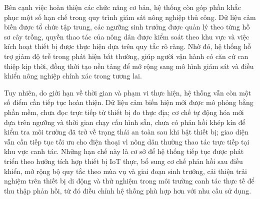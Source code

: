 \documentclass[13pt,a4paper]{extarticle}
\numberwithin{figure}{section}
\numberwithin{table}{section}
\begin{document}
	Bên cạnh việc hoàn thiện các chức năng cơ bản, hệ thống còn góp phần khắc phục một số hạn chế trong quy trình giám sát nông nghiệp thủ công. Dữ liệu cảm biến được tổ chức tập trung, các ngưỡng sinh trưởng được quản lý theo từng hồ sơ cây trồng, quyền thao tác của nông dân được kiểm soát theo khu vực và việc kích hoạt thiết bị được thực hiện dựa trên quy tắc rõ ràng. Nhờ đó, hệ thống hỗ trợ giảm độ trễ trong phát hiện bất thường, giúp người vận hành có căn cứ can thiệp kịp thời, đồng thời tạo nền tảng để mở rộng sang mô hình giám sát và điều khiển nông nghiệp chính xác trong tương lai.
	
	Tuy nhiên, do giới hạn về thời gian và phạm vi thực hiện, hệ thống vẫn còn một số điểm cần tiếp tục hoàn thiện. Dữ liệu cảm biến hiện mới được mô phỏng bằng phần mềm, chưa đọc trực tiếp từ thiết bị đo thực địa; cơ chế tự động hóa mới dựa trên ngưỡng và thời gian chạy cấu hình sẵn, chưa có phản hồi khép kín để kiểm tra môi trường đã trở về trạng thái an toàn sau khi bật thiết bị; giao diện vẫn cần tiếp tục tối ưu cho điện thoại vì nông dân thường thao tác trực tiếp tại khu vực canh tác. Những hạn chế này là cơ sở để hệ thống tiếp tục được phát triển theo hướng tích hợp thiết bị IoT thực, bổ sung cơ chế phản hồi sau điều khiển, mở rộng bộ quy tắc theo mùa vụ và giai đoạn sinh trưởng, cải thiện trải nghiệm trên thiết bị di động và thử nghiệm trong môi trường canh tác thực tế để thu thập phản hồi, từ đó điều chỉnh hệ thống phù hợp hơn với nhu cầu sử dụng.
	
\end{document}
